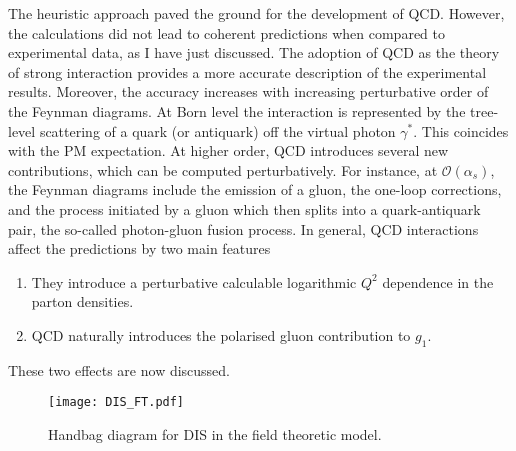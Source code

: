 The heuristic approach paved the ground for the development of QCD. However, the calculations did not lead to coherent predictions when compared to experimental data, as I have just discussed. The adoption of QCD as the theory of strong interaction provides a more accurate description of the experimental results. Moreover, the accuracy increases with increasing perturbative order of the Feynman diagrams. At Born level the interaction is represented by the tree-level scattering of a quark (or antiquark) off the virtual photon $\gamma^{*}$. This coincides with the PM expectation. At higher order, QCD introduces several new contributions, which can be computed perturbatively. For instance, at $\mathcal{O}(\alpha_{s})$, the Feynman diagrams include the emission of a gluon, the one-loop corrections, and the process initiated by a gluon which then splits into a quark-antiquark pair, the so-called photon-gluon fusion process. In general, QCD interactions affect the predictions by two main features
\begin{enumerate}
  \item They introduce a perturbative calculable logarithmic $Q^2$ dependence in the parton densities.
  \item QCD naturally introduces the polarised gluon contribution to $g_1$.  
\end{enumerate}
These two effects are now discussed.

\begin{figure}[t]
  \centering
  \texttt{[image: DIS\_FT.pdf]} 
  \caption{Handbag diagram for DIS in the field theoretic model.}
  \label{fig:DIS_FT}
\end{figure}

